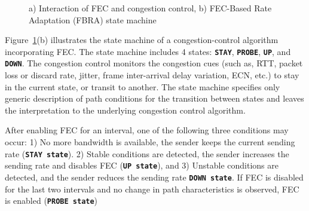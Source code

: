 
\begin{figure}
  \centering
\caption{a) Interaction of FEC and congestion control, b) FEC-Based Rate
Adaptation (FBRA) state machine }
\label{fig:fecrc-intro}
\end{figure}

Figure~\ref{fig:fecrc-intro}(b) illustrates the state machine of a
congestion-control algorithm incorporating FEC. The state machine includes 4
states: \texttt{\textbf{STAY}}, \texttt{\textbf{PROBE}}, \texttt{\textbf{UP}},
and \texttt{\textbf{DOWN}}. The congestion control monitors the congestion
cues (such as, RTT, packet loss or discard rate, jitter, frame inter-arrival
delay variation, ECN, etc.) to stay in the current state, or transit to
another. The state machine specifies only generic description of path
conditions for the transition between states and leaves the interpretation to
the underlying congestion control algorithm.

After enabling FEC for an interval, one of the following three conditions may
occur: 1) No more bandwidth is available, the sender keeps the current sending
rate (\texttt{\textbf{STAY state}}). 2) Stable conditions are detected, the
sender increases the sending rate and disables FEC (\texttt{\textbf{UP
state}}), and 3) Unstable conditions are detected, and the sender reduces the
sending rate \texttt{\textbf{DOWN state}}. If FEC is disabled for the last two
intervals and no change in path characteristics is observed, FEC is enabled
(\texttt{\textbf{PROBE state}})

